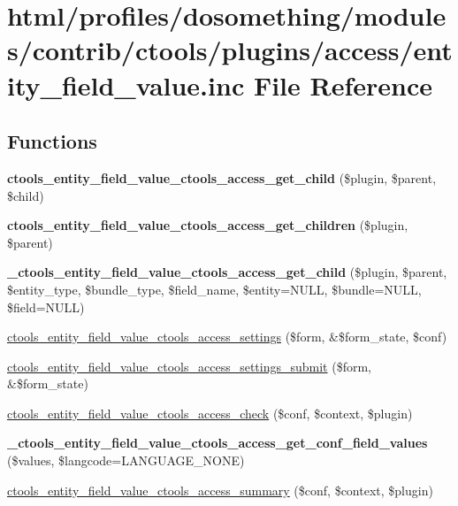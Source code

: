\hypertarget{entity__field__value_8inc}{
\section{html/profiles/dosomething/modules/contrib/ctools/plugins/access/entity\_\-field\_\-value.inc File Reference}
\label{entity__field__value_8inc}
}
\subsection*{Functions}
\begin{DoxyCompactItemize}
\item 
\hypertarget{entity__field__value_8inc_a009ee5115bfee19f7282f2197e9f5225}{
{\bfseries ctools\_\-entity\_\-field\_\-value\_\-ctools\_\-access\_\-get\_\-child} (\$plugin, \$parent, \$child)}
\label{entity__field__value_8inc_a009ee5115bfee19f7282f2197e9f5225}

\item 
\hypertarget{entity__field__value_8inc_a7d5b8a7df5669bdd2777da1efa42bbf7}{
{\bfseries ctools\_\-entity\_\-field\_\-value\_\-ctools\_\-access\_\-get\_\-children} (\$plugin, \$parent)}
\label{entity__field__value_8inc_a7d5b8a7df5669bdd2777da1efa42bbf7}

\item 
\hypertarget{entity__field__value_8inc_aeffc815552912dace240f1cab75e5946}{
{\bfseries \_\-ctools\_\-entity\_\-field\_\-value\_\-ctools\_\-access\_\-get\_\-child} (\$plugin, \$parent, \$entity\_\-type, \$bundle\_\-type, \$field\_\-name, \$entity=NULL, \$bundle=NULL, \$field=NULL)}
\label{entity__field__value_8inc_aeffc815552912dace240f1cab75e5946}

\item 
\hyperlink{entity__field__value_8inc_a6de8332631f237ef4baaacc10ce923fc}{ctools\_\-entity\_\-field\_\-value\_\-ctools\_\-access\_\-settings} (\$form, \&\$form\_\-state, \$conf)
\item 
\hyperlink{entity__field__value_8inc_a8af33147764d3a5269cf91065f0ad712}{ctools\_\-entity\_\-field\_\-value\_\-ctools\_\-access\_\-settings\_\-submit} (\$form, \&\$form\_\-state)
\item 
\hyperlink{entity__field__value_8inc_a283742a7d2f2bd22e5c08fbd6cdb7300}{ctools\_\-entity\_\-field\_\-value\_\-ctools\_\-access\_\-check} (\$conf, \$context, \$plugin)
\item 
\hypertarget{entity__field__value_8inc_acb2d324d8b8c9221ecf8b09c1d568cf1}{
{\bfseries \_\-ctools\_\-entity\_\-field\_\-value\_\-ctools\_\-access\_\-get\_\-conf\_\-field\_\-values} (\$values, \$langcode=LANGUAGE\_\-NONE)}
\label{entity__field__value_8inc_acb2d324d8b8c9221ecf8b09c1d568cf1}

\item 
\hyperlink{entity__field__value_8inc_ad084c59021feb9bfa727b3c62476ccf7}{ctools\_\-entity\_\-field\_\-value\_\-ctools\_\-access\_\-summary} (\$conf, \$context, \$plugin)
\end{DoxyCompactItemize}
